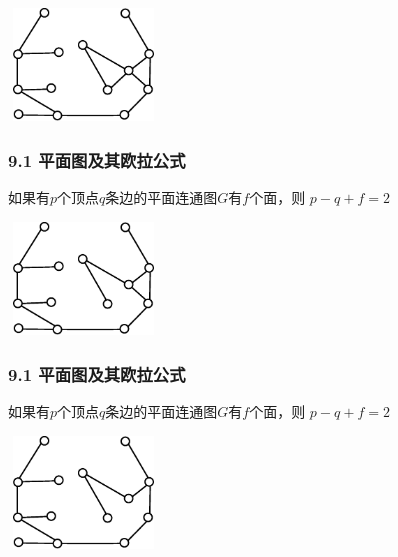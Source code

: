 \documentclass{beamer}
\begin{document}
\begin{CJK}{UTF8}{gbsn}
\begin{frame}
\vspace{1cm}
\centering
    \includegraphics[width=4cm,height=3cm]{euler4}
\end{frame}
\begin{frame}
  \frametitle{9.1 平面图及其欧拉公式}
  \begin{Thm1}
    如果有$p$个顶点$q$条边的平面连通图$G$有$f$个面，则
      $p - q + f = 2$
  \end{Thm1}
\vspace{1cm}
\centering
    \includegraphics[width=4cm,height=3cm]{euler5}
\end{frame}

\begin{frame}
  \frametitle{9.1 平面图及其欧拉公式}
  \begin{Thm1}
    如果有$p$个顶点$q$条边的平面连通图$G$有$f$个面，则
      $p - q + f = 2$
  \end{Thm1}
\vspace{1cm}
\centering
    \includegraphics[width=4cm,height=3cm]{euler6}
\end{frame}


\end{CJK}
\end{document}
